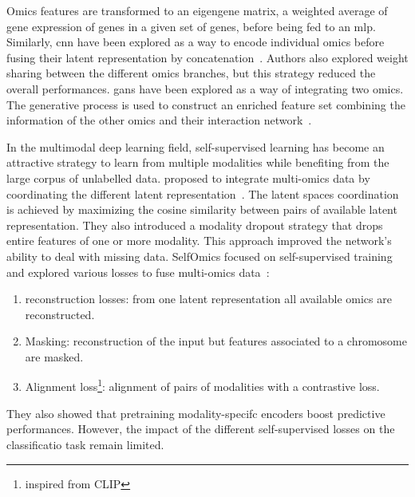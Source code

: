 \documentclass[../main.tex]{subfiles}
\begin{document}
		Omics features are transformed to an eigengene matrix, a weighted average of gene expression of genes in a given set of genes, before being fed to an \gls{mlp}.
		Similarly, \gls{cnn} have been explored as a way to encode individual omics before fusing their latent representation by concatenation~\cite{MohaiminulIslam2020}.
		Authors also explored weight sharing between the different omics branches, but this strategy reduced the overall performances.
		\Glspl{gan} have been explored as a way of integrating two omics.
		The generative process is used to construct an enriched feature set combining the information of the other omics and their interaction network~\cite{omicsGAN}.

		In the multimodal deep learning field, self-supervised learning has become an attractive strategy to learn from multiple modalities while benefiting from the large corpus of unlabelled data.
		\citeauthor{Cheerla2019} proposed to integrate multi-omics data by coordinating the different latent representation~\cite{Cheerla2019}.
		The latent spaces coordination is achieved by maximizing the cosine similarity between pairs of available latent representation.
		They also introduced a modality dropout strategy that drops entire features of one or more modality.
		This approach improved the network’s ability to deal with missing data.
		SelfOmics focused on self-supervised training and explored various losses to fuse multi-omics data~\cite{selfOmics}:
		\begin{enumerate}[nosep]
			\item reconstruction losses: from one latent representation all available omics are reconstructed.
			\item Masking: reconstruction of the input but features associated to a chromosome are masked.
			\item Alignment loss\footnote{inspired from CLIP}: alignment of pairs of modalities with a contrastive loss.
		\end{enumerate}
		They also showed that pretraining modality-specifc encoders boost predictive performances.
		However, the impact of the different self-supervised losses on the classificatio task remain limited.
\end{document}

